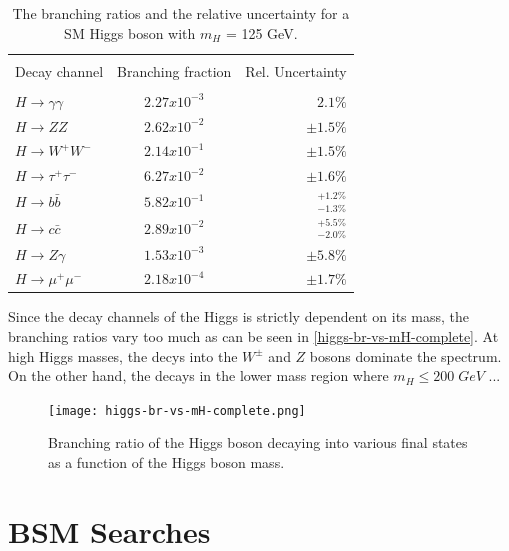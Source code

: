 \begin{table}[ht]
	{\setlength{\tabcolsep}{14pt}
		\caption[The branching ratios and the relative uncertainty for a SM Higgs boson with $m_H$ = 125 GeV.]{The branching ratios and the relative uncertainty for a SM Higgs boson with $m_H$ = 125 GeV\cite{higgs-br-vs-mH, higg-phen-3}.}
		\begin{center}
			\vspace{-6mm}
			\begin{tabular}{lcr}
				\hline \\[-2.45ex] \hline \\[-2.1ex]
				Decay channel & Branching fraction & Rel. Uncertainty \\
				\hline \\[-1.8ex]
                $H\rightarrow \gamma\gamma$ & $2.27x10^{-3}$ & $2.1\%$\\
                $H\rightarrow ZZ$ & $2.62x10^{-2}$ & $\pm 1.5\%$\\
                $H\rightarrow W^+W^-$ & $2.14x10^{-1}$ &$\pm 1.5\%$ \\
                $H\rightarrow \tau^+\tau^-$ & $6.27x10^{-2}$ &$\pm 1.6\%$ \\
                $H\rightarrow b\bar b$ & $5.82x10^{-1}$ & $^{+1.2\%}_{-1.3\%}$\\
                $H\rightarrow c \bar c$ & $2.89x10^{-2}$ &$^{+5.5\%}_{-2.0\%}$ \\
                $H\rightarrow Z\gamma$ & $1.53x10^{-3}$ & $\pm 5.8\%$\\
                $H\rightarrow \mu^+\mu^-$ & $2.18x10^{-4}$ &$\pm 1.7\%$ \\
				\hline
			\end{tabular}
			\vspace{-6mm}
		\end{center}
		\label{HiggsBRtable}}
\end{table}

Since the decay channels of the Higgs is strictly dependent on its mass, the branching ratios vary too much as can be seen in \autoref{higgs-br-vs-mH-complete}. At high Higgs masses, the decys into the $W^\pm$ and $Z$ bosons dominate the spectrum. On the other hand, the decays in the lower mass region where $m_H \le 200\; GeV$ ... 


\begin{figure}[ht]
	\centering
	\texttt{[image: higgs-br-vs-mH-complete.png]}
	\caption[Branching ratio of the Higgs boson decaying into various final states as a function of the Higgs boson mass.]{Branching ratio of the Higgs boson decaying into various final states as a function of the Higgs boson mass\cite{higg-phen-3}.}
	\label{higgs-br-vs-mH-complete}
\end{figure}









\section{BSM Searches}

